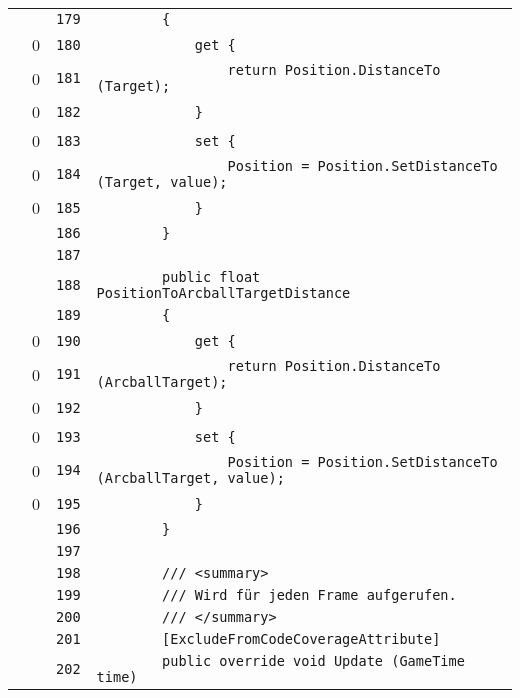 \documentclass[a4paper,10pt]{article}
\begin{document}
\begin{longtable}[l]{lrrl}
\cellcolor{gray} &  & \verb~179~ & \verb~        {~\\
\cellcolor{red} & 0 & \verb~180~ & \verb~            get {~\\
\cellcolor{red} & 0 & \verb~181~ & \verb~                return Position.DistanceTo (Target);~\\
\cellcolor{red} & 0 & \verb~182~ & \verb~            }~\\
\cellcolor{red} & 0 & \verb~183~ & \verb~            set {~\\
\cellcolor{red} & 0 & \verb~184~ & \verb~                Position = Position.SetDistanceTo (Target, value);~\\
\cellcolor{red} & 0 & \verb~185~ & \verb~            }~\\
\cellcolor{gray} &  & \verb~186~ & \verb~        }~\\
\cellcolor{gray} &  & \verb~187~ & \verb~~\\
\cellcolor{gray} &  & \verb~188~ & \verb~        public float PositionToArcballTargetDistance~\\
\cellcolor{gray} &  & \verb~189~ & \verb~        {~\\
\cellcolor{red} & 0 & \verb~190~ & \verb~            get {~\\
\cellcolor{red} & 0 & \verb~191~ & \verb~                return Position.DistanceTo (ArcballTarget);~\\
\cellcolor{red} & 0 & \verb~192~ & \verb~            }~\\
\cellcolor{red} & 0 & \verb~193~ & \verb~            set {~\\
\cellcolor{red} & 0 & \verb~194~ & \verb~                Position = Position.SetDistanceTo (ArcballTarget, value);~\\
\cellcolor{red} & 0 & \verb~195~ & \verb~            }~\\
\cellcolor{gray} &  & \verb~196~ & \verb~        }~\\
\cellcolor{gray} &  & \verb~197~ & \verb~~\\
\cellcolor{gray} &  & \verb~198~ & \verb~        /// <summary>~\\
\cellcolor{gray} &  & \verb~199~ & \verb~        /// Wird für jeden Frame aufgerufen.~\\
\cellcolor{gray} &  & \verb~200~ & \verb~        /// </summary>~\\
\cellcolor{gray} &  & \verb~201~ & \verb~        [ExcludeFromCodeCoverageAttribute]~\\
\cellcolor{gray} &  & \verb~202~ & \verb~        public override void Update (GameTime time)~\\

\end{longtable}
\end{document}
